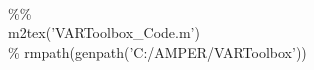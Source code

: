 \hspace{1mm}\hspace{5mm} \hspace{5mm} \hspace{5mm} \hspace{5mm} \hspace{5mm} \hspace{5mm}  \\ 
\hspace{1mm}\hspace{5mm} \hspace{5mm} \hspace{5mm} \hspace{5mm} \hspace{5mm} \hspace{5mm} \textcolor{matlabgreen}{\%}\textcolor{matlabgreen}{\% }\\ 
\hspace{1mm}\hspace{5mm} \hspace{5mm} \hspace{5mm} \hspace{5mm} \hspace{5mm} \hspace{5mm} m2tex(\textcolor{matlabpurple}{'VARToolbox\_Code.m'}) \\ 
\hspace{1mm}\hspace{5mm} \hspace{5mm} \hspace{5mm} \hspace{5mm} \hspace{5mm} \hspace{5mm} \textcolor{matlabgreen}{\% rmpath(genpath('C:/AMPER/VARToolbox')) }\\ 
\hspace{1mm}\hspace{5mm} \hspace{5mm} \hspace{5mm} \hspace{5mm} \hspace{5mm} \hspace{5mm}  \\ 
\hspace{1mm}\hspace{5mm} \hspace{5mm} \hspace{5mm} \hspace{5mm} \hspace{5mm} \hspace{5mm}  \\ 
